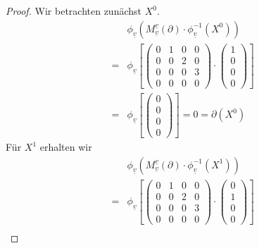 \documentclass{article}
\begin{document}
\begin{enumerate}[(a)]
\begin{enumerate}[1.)]
\begin{proof}
            Wir betrachten zunächst $X^0$.
            \begin{align*}
                &\phi_{\underline{v}}(M_{\underline{v}}^{\underline{v}} (\partial) \cdot \phi_{\underline{v}}^{-1}(X^0))\\
                =&\phi_{\underline{v}}
                    \left[
                    \begin{pmatrix}
                        0 & 1 & 0 & 0\\
                        0 & 0 & 2 & 0\\
                        0 & 0 & 0 & 3\\
                        0 & 0 & 0 & 0
                    \end{pmatrix} \cdot 
                    \begin{pmatrix}1 \\ 0 \\ 0 \\ 0\end{pmatrix}
                    \right]\\
                =&\phi_{\underline{v}}
                    \left[\begin{pmatrix}0 \\ 0 \\ 0 \\ 0\end{pmatrix}\right]
                    = 0 = \partial(X^0)
            \end{align*}
            Für $X^1$ erhalten wir
            \begin{align*}
                &\phi_{\underline{v}}(M_{\underline{v}}^{\underline{v}} (\partial) \cdot \phi_{\underline{v}}^{-1}(X^1))\\
                =&\phi_{\underline{v}}
                    \left[
                    \begin{pmatrix}
                        0 & 1 & 0 & 0\\
                        0 & 0 & 2 & 0\\
                        0 & 0 & 0 & 3\\
                        0 & 0 & 0 & 0
                    \end{pmatrix} \cdot 
                    \begin{pmatrix}0 \\ 1 \\ 0 \\ 0\end{pmatrix}
                    \right]\\

\end{align*}
\end{proof}
\end{enumerate}
\end{enumerate}
\end{document}
